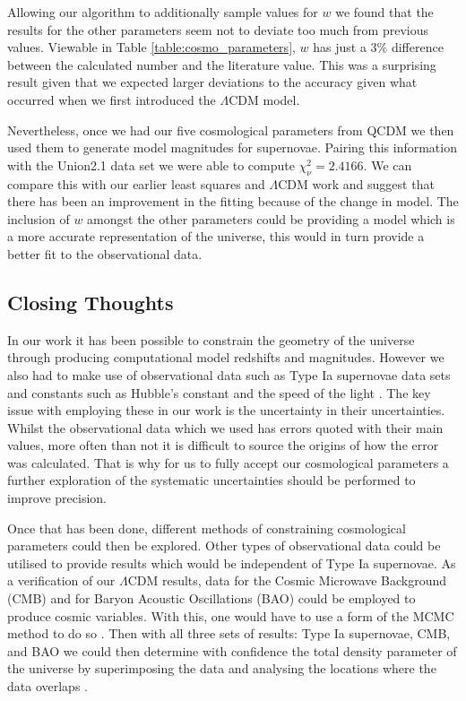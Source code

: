 \documentclass[twocolumn]{revtex4}
\begin{document}
{{{Allowing our algorithm to additionally sample values for $w$ we found that the results for the other parameters seem not to deviate too much from previous values. Viewable in Table \ref{table:cosmo_parameters}, $w$ has just a $3\%$ difference between the calculated number and the literature value. This was a surprising result given that we expected larger deviations to the accuracy given what occurred when we first introduced the $\Lambda$CDM model. 

Nevertheless, once we had our five cosmological parameters from QCDM we then used them to generate model magnitudes for supernovae. Pairing this information with the Union2.1 data set we were able to compute $\chi^2_\nu= 2.4166$. We can compare this with our earlier least squares and $\Lambda$CDM work and suggest that there has been an improvement in the fitting because of the change in model. The inclusion of $w$ amongst the other parameters could be providing a model which is a more accurate representation of the universe, this would in turn provide a better fit to the observational data. 

\vspace{-3ex}
\subsection{Closing Thoughts} 
\vspace{-2ex}
In our work it has been possible to constrain the geometry of the universe through producing computational model redshifts and magnitudes. However we also had to make use of observational data such as Type Ia supernovae data sets \cite{dataset_1, dataset_2} and constants such as Hubble's constant \cite{hubble_constant} and the speed of the light \cite{speed_of_light}. The key issue with employing these in our work is the uncertainty in their uncertainties. Whilst the observational data which we used has errors quoted with their main values, more often than not it is difficult to source the origins of how the error was calculated. That is why for us to fully accept our cosmological parameters a further exploration of the systematic uncertainties should be performed to improve precision. 

Once that has been done, different methods of constraining cosmological parameters could then be explored. Other types of observational data could be utilised to provide results which would be independent of Type Ia supernovae. As a verification of our $\Lambda$CDM results, data for the Cosmic Microwave Background (CMB) and for Baryon Acoustic Oscillations (BAO) could be employed to produce cosmic variables. With this, one would have to use a form of the MCMC method to do so \cite{cmb_cosmo, dataset_2}. Then with all three sets of results: Type Ia supernovae, CMB, and BAO we could then determine with confidence the total density parameter of the universe by superimposing the data and analysing the locations where the data overlaps \cite{dataset_2}.

}}}
\end{document}
